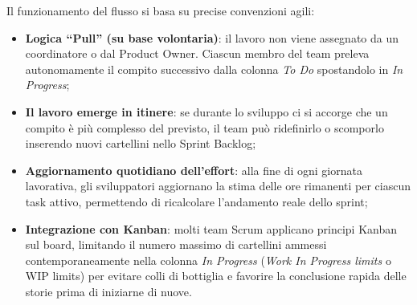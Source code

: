 \documentclass[12pt]{extarticle}
\begin{document}
\noindent Il funzionamento del flusso si basa su precise convenzioni agili:
\begin{itemize}
    \item \textbf{Logica ``Pull'' (su base volontaria)}: il lavoro non viene assegnato da un coordinatore o dal Product Owner. Ciascun membro del team preleva autonomamente il compito successivo dalla colonna \textit{To Do} spostandolo in \textit{In Progress};
    \item \textbf{Il lavoro emerge in itinere}: se durante lo sviluppo ci si accorge che un compito è più complesso del previsto, il team può ridefinirlo o scomporlo inserendo nuovi cartellini nello Sprint Backlog;
    \item \textbf{Aggiornamento quotidiano dell'effort}: alla fine di ogni giornata lavorativa, gli sviluppatori aggiornano la stima delle ore rimanenti per ciascun task attivo, permettendo di ricalcolare l'andamento reale dello sprint;
    \item \textbf{Integrazione con Kanban}: molti team Scrum applicano principi Kanban sul board, limitando il numero massimo di cartellini ammessi contemporaneamente nella colonna \textit{In Progress} (\textit{Work In Progress limits} o WIP limits) per evitare colli di bottiglia e favorire la conclusione rapida delle storie prima di iniziarne di nuove.
\end{itemize}
\end{document}
